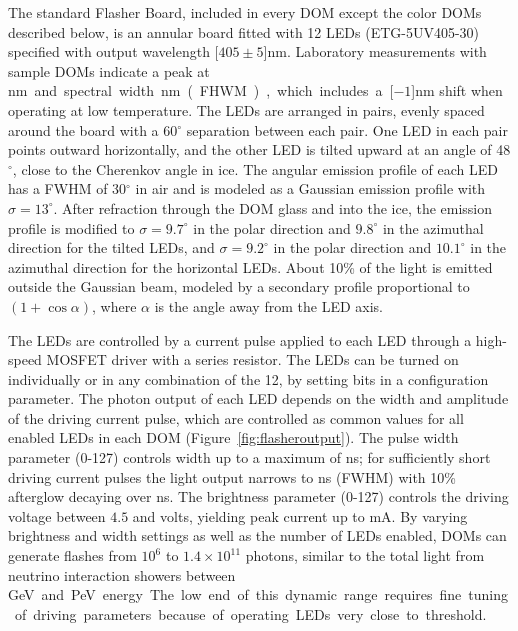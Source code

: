 The standard Flasher Board, included in every DOM except the color DOMs
described below, is an annular board fitted with 12 LEDs (ETG-5UV405-30)
specified with output wavelength \unit[$405\pm5$]nm.  Laboratory
measurements with sample DOMs indicate a peak at
\unit[399]nm and spectral width \unit[14]nm (FHWM), which includes a
\unit[$-1$]nm shift when operating at low temperature.
The LEDs are arranged in pairs, evenly spaced around the board
with a 60$^{\circ}$ separation between each pair. One LED in each pair
points outward horizontally, and the other LED is tilted upward at an angle
of 48$^{\circ}$, close to the Cherenkov angle in ice.
The angular emission profile of each LED has a FWHM of
30$^{\circ}$ in air and is modeled as a Gaussian emission profile
with $\sigma = 13^{\circ}$. After refraction through the DOM glass and into
the ice, the emission profile is modified to $\sigma = 9.7^{\circ}$ in the polar direction
and $9.8^{\circ}$ in the azimuthal direction for the tilted LEDs, and $\sigma=9.2^{\circ}$ in the polar direction
and $10.1^{\circ}$ in the azimuthal direction for the horizontal LEDs.
About 10\% of the light is emitted outside the Gaussian beam, modeled by
a secondary profile proportional to $(1+\cos{\alpha})$, where $\alpha$ is the angle
away from the LED axis.

The LEDs are controlled by a current pulse applied to each LED through
a high-speed MOSFET driver with a series resistor. The LEDs can be turned on individually or in any
combination of the 12, by setting bits in a configuration parameter.
The photon output of each LED depends on the width and
amplitude of the driving current pulse, which are controlled as common
values for all enabled LEDs in each DOM (Figure~\ref{fig:flasheroutput}).  
The pulse width parameter (0-127) controls width up to a maximum of \unit[70]{ns}; 
for sufficiently short driving current pulses the light output narrows to \unit[6]{ns} (FWHM) with
10\% afterglow decaying over \unit[15--20]{ns}.
The brightness parameter (0-127) controls the driving voltage between $4.5$ and \unit[15]{volts}, yielding
peak current up to \unit[300]{mA}.
By varying brightness and width settings as well as the number of LEDs enabled, DOMs can generate flashes
from $10^6$ to $1.4\times10^{11}$ photons, similar to the total light from
neutrino interaction showers between \unit[7]GeV and \unit[1]PeV energy.
The low end of this dynamic range requires fine tuning of driving parameters because of
operating LEDs very close to threshold.

